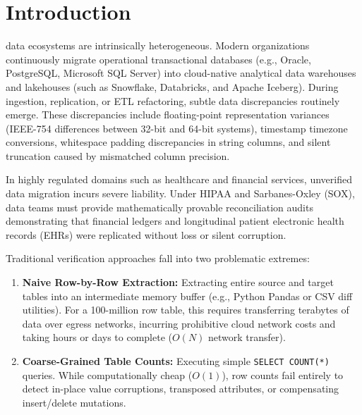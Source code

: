 \documentclass[10pt,journal,compsoc]{IEEEtran}
\begin{document}
\section{Introduction}
 data ecosystems are intrinsically heterogeneous. Modern organizations continuously migrate operational transactional databases (e.g., Oracle, PostgreSQL, Microsoft SQL Server) into cloud-native analytical data warehouses and lakehouses (such as Snowflake, Databricks, and Apache Iceberg). During ingestion, replication, or ETL refactoring, subtle data discrepancies routinely emerge. These discrepancies include floating-point representation variances (IEEE-754 differences between 32-bit and 64-bit systems), timestamp timezone conversions, whitespace padding discrepancies in string columns, and silent truncation caused by mismatched column precision.

In highly regulated domains such as healthcare and financial services, unverified data migration incurs severe liability. Under HIPAA and Sarbanes-Oxley (SOX), data teams must provide mathematically provable reconciliation audits demonstrating that financial ledgers and longitudinal patient electronic health records (EHRs) were replicated without loss or silent corruption.

Traditional verification approaches fall into two problematic extremes:
\begin{enumerate}
    \item \textbf{Naive Row-by-Row Extraction:} Extracting entire source and target tables into an intermediate memory buffer (e.g., Python Pandas or CSV diff utilities). For a 100-million row table, this requires transferring terabytes of data over egress networks, incurring prohibitive cloud network costs and taking hours or days to complete ($O(N)$ network transfer).
    \item \textbf{Coarse-Grained Table Counts:} Executing simple \texttt{SELECT COUNT(*)} queries. While computationally cheap ($O(1)$), row counts fail entirely to detect in-place value corruptions, transposed attributes, or compensating insert/delete mutations.
\end{enumerate}
\end{document}
